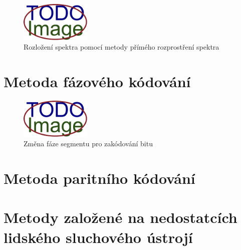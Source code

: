 
\blindtext

\begin{figure}[hbt]
    \centering
    \includegraphics[width=0.3\textwidth]{obrazky/placeholder.pdf}
    \caption{Rozložení spektra pomocí metody přímého rozprostření spektra}
    \label{pic:dsss-spreading}
\end{figure}

\blindtext

\section{Metoda fázového kódování}
\label{sec:phase-coding}


\blindtext

\begin{figure}[hbt]
    \centering
    \includegraphics[width=0.3\textwidth]{obrazky/placeholder.pdf}
    \caption{Změna fáze segmentu pro zakódování bitu}
    \label{pic:phase-coding-phase-change}
\end{figure}

\blindtext

\section{Metoda paritního kódování}
\label{sec:parity-coding}


\blindtext

\blindtext

\blindtext

\section{Metody založené na nedostatcích lidského sluchového ústrojí}
\label{sec:has}

